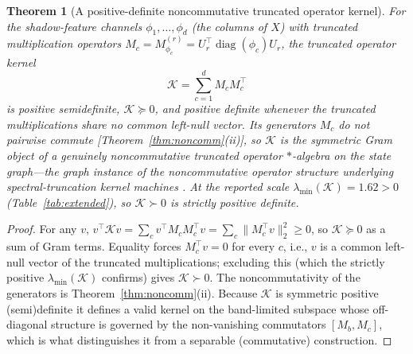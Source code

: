 \documentclass[aps,prresearch,reprint,amsmath,amssymb,nofootinbib,superscriptaddress,floatfix]{revtex4-2}
\newtheorem{theorem}{Theorem}
\theoremstyle{definition}
\theoremstyle{remark}
\theoremstyle{plain}
\begin{document}
\begin{theorem}[A positive-definite noncommutative truncated operator kernel]
\label{thm:kernel}
For the shadow-feature channels $\phi_1,\dots,\phi_d$ (the columns of $X$) with truncated multiplication
operators $M_c=M_{\phi_c}^{(r)}=U_r^\top\operatorname{diag}(\phi_c)U_r$, the truncated operator kernel
\begin{equation}
\label{eq:nckernel}
\mathcal K=\sum_{c=1}^{d} M_c M_c^\top
\end{equation}
is positive semidefinite, $\mathcal K\succeq0$, and positive definite whenever the truncated
multiplications share no common left-null vector. Its generators $M_c$ do not pairwise commute
[Theorem~\ref{thm:noncomm}(ii)], so $\mathcal K$ is the symmetric Gram object of a genuinely noncommutative
truncated operator $*$-algebra on the state graph---the graph instance of the noncommutative operator
structure underlying spectral-truncation kernel machines \cite{hashimoto2026spectral}. At the reported
scale $\lambda_{\min}(\mathcal K)=\num{1.62}>0$ (Table~\ref{tab:extended}), so $\mathcal K\succ0$ is
strictly positive definite.
\end{theorem}
\begin{proof}
For any $v$, $v^\top\mathcal K v=\sum_c v^\top M_cM_c^\top v=\sum_c\|M_c^\top v\|_2^2\ge0$, so
$\mathcal K\succeq0$ as a sum of Gram terms. Equality forces $M_c^\top v=0$ for every $c$, i.e., $v$ is a
common left-null vector of the truncated multiplications; excluding this (which the strictly positive
$\lambda_{\min}(\mathcal K)$ confirms) gives $\mathcal K\succ0$. The noncommutativity of the generators is
Theorem~\ref{thm:noncomm}(ii). Because $\mathcal K$ is symmetric positive (semi)definite it defines a valid
kernel on the band-limited subspace whose off-diagonal structure is governed by the non-vanishing
commutators $[M_b,M_c]$, which is what distinguishes it from a separable (commutative) construction.
\end{proof}
\end{document}
